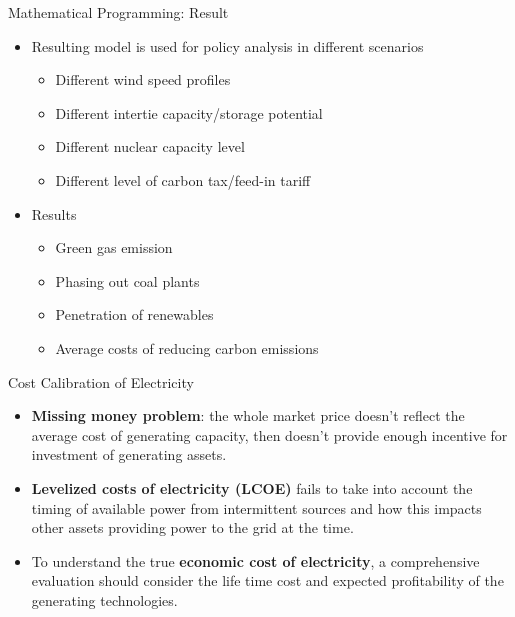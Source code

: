 \documentclass[newPxFont,numfooter,progressbar,sectionpages]{beamer}
\begin{document}

\begin{frame}[c]{Mathematical Programming: Result}

\begin{itemize}
\item Resulting model is used for policy analysis in different scenarios
\begin{itemize}
\item Different wind speed profiles
\item Different intertie capacity/storage potential
\item Different nuclear capacity level 	 
\item Different level of carbon tax/feed-in tariff
\end{itemize}
\item Results 
\begin{itemize}
\item Green gas emission
\item Phasing out coal plants
\item Penetration of renewables 	 
\item Average costs of reducing carbon emissions 
\end{itemize}
\end{itemize}

\end{frame}





\begin{frame}[c]{Cost Calibration of Electricity}

\begin{itemize}
\item \textbf{Missing money problem}: the whole market price doesn't reflect the average cost of generating capacity, then doesn't provide enough incentive for investment of generating assets.  

\item \textbf{Levelized costs of electricity (LCOE)} fails to take into account the timing of available power from intermittent sources and how this impacts other assets providing power to the grid at the time.  

\item To understand the true \textbf{economic cost of electricity}, a comprehensive evaluation should consider the life time cost and expected profitability of the generating technologies.

\end{itemize}


\end{frame}
\end{document}
